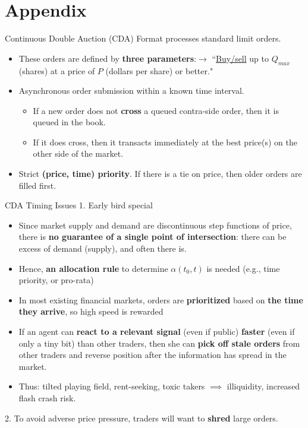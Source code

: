 \documentclass[10pt]{beamer}
\begin{document}

\section{Appendix}


\begin{frame}{Continuous Double Auction (CDA) Format}
processes standard limit orders.
\begin{itemize}
    \item These orders are defined by \textbf{three parameters}:$\rightarrow$ ``\underline{Buy/sell} up to \underline{$Q_{max}$} (shares) at a price of \underline{$P$} (dollars per share) or better."
\item Asynchronous order submission within a known time interval. 
\begin{itemize}
\item If a new order does not \textbf{cross} a queued contra-side order, then it is queued in the book. 
\item If it does cross, then it transacts immediately at the best price(s) on the other side of the market.
\end{itemize}
\item Strict \textbf{(price, time) priority}. If there is a tie on price, then older orders are filled first.
    \end{itemize} 
\end{frame}



\begin{frame}{CDA Timing Issues}
1. Early bird special  
    \begin{itemize}
        \item Since market supply and demand are discontinuous step functions of price, there is \textbf{no guarantee of a single point of intersection}: there can be excess of demand (supply), and often there is. 
        \item Hence, \textbf{an allocation rule} to determine $\alpha(t_0, t)$ is needed (e.g., time priority, or pro-rata)
\item In most existing financial markets, orders are \textbf{prioritized} based on \textbf{the time they arrive}, so high speed is rewarded
\item If an agent can \textbf{react to a relevant signal} (even if public) \textbf{faster} (even if only a tiny bit) than other traders, then she can \textbf{pick off stale orders} from other traders and reverse position after the information has spread in the market.
\item  Thus: tilted playing field, rent-seeking, toxic takers $\implies$ illiquidity, increased flash crash risk.
    \end{itemize}
    2. To avoid adverse price pressure, traders will want to \textbf{shred} large orders.
    \end{frame}
\end{document}
